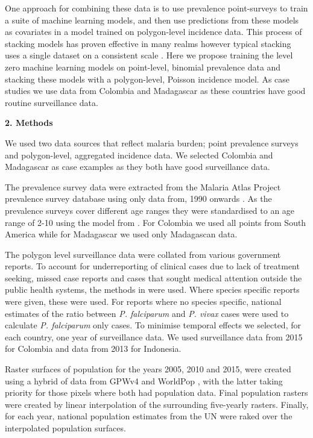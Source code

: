 \documentclass[11pt]{article}
\begin{document}
One approach for combining these data is to use prevalence point-surveys to train a suite of machine learning models, and then use predictions from these models as covariates in a model trained on polygon-level incidence data. 
This process of stacking models has proven effective in many realms however typical stacking uses a single dataset on a consistent scale \cite{Sill2009, bhatt2017improved}. 
Here we propose training the level zero machine learning models on point-level, binomial prevalence data and stacking these models with a polygon-level, Poisson incidence model. 
As case studies we use data from Colombia and Madagascar as these countries have  good routine surveillance data.


{\bf 2. Methods}

We used two data sources that reflect malaria burden; point prevalence surveys and polygon-level, aggregated incidence data. 
We selected Colombia and Madagascar as case examples as they both have good surveillance data.

The prevalence survey data were extracted from the Malaria Atlas Project prevalence survey database using only data from, 1990 onwards \cite{bhatt2015effect}. 
As the prevalence surveys cover different age ranges they were standardised to an age range of 2-10 using the model from \cite{smith2007standardizing}. 
For Colombia we used all points from South America while for Madagascar we used only Madagascan data.

The polygon level surveillance data were collated from various government reports. To account for underreporting of clinical cases due to lack of treatment seeking, missed case reports and cases that sought medical attention outside the public health systems, the methods in \cite{cibulskis2011worldwide} were used. Where species specific reports were given, these were used. For reports where no species specific, national estimates of the ratio between \emph{P. falciparum} and \emph{P. vivax} cases were used to calculate \emph{P. falciparum} only cases. To minimise temporal effects we selected, for each country, one year of surveillance data. 
We used surveillance data from 2015 for Colombia and data from 2013 for Indonesia.

Raster surfaces of population for the years 2005, 2010 and 2015, were created using a hybrid of data from GPWv4 \cite{gpw4} and WorldPop \cite{tatem2017worldpop}, with the latter taking priority for those pixels where both had population data. 
Final population rasters were created by linear interpolation of the surrounding five-yearly rasters. 
Finally, for each year, national population estimates from the UN were raked over the interpolated population surfaces. 
\end{document}
